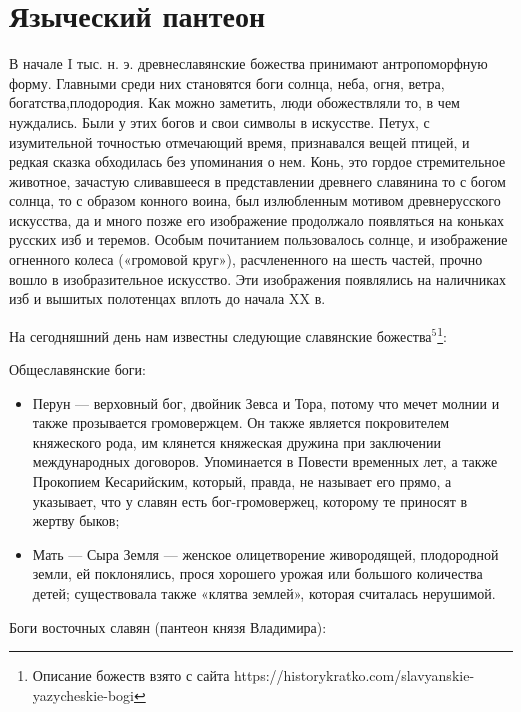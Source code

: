 \documentclass[a4paper, 12pt]{report}
\begin{document}
\section{Языческий пантеон}
В начале I тыс. н. э. древнеславянские божества принимают
антропоморфную форму. Главными среди них становятся боги солнца, неба, огня, ветра,
богатства,плодородия. Как можно заметить, люди обожествляли то, в чем нуждались. 
Были у этих богов и свои символы в искусстве. Петух, с изумительной
точностью отмечающий время, признавался вещей птицей, и редкая сказка
обходилась без упоминания о нем. Конь, это гордое стремительное
животное, зачастую сливавшееся в представлении древнего славянина то с
богом солнца, то с образом конного воина, был излюбленным мотивом
древнерусского искусства, да и много позже его изображение продолжало
появляться на коньках русских изб и теремов. Особым почитанием
пользовалось солнце, и изображение огненного колеса («громовой круг»),
расчлененного на шесть частей, прочно вошло в изобразительное искусство.
Эти изображения появлялись на наличниках изб и вышитых полотенцах
вплоть до начала XX в.


На сегодняшний день нам известны следующие славянские божества$^5$\footnote{Описание божеств взято с сайта https://historykratko.com/slavyanskie-yazycheskie-bogi}:

Общеславянские боги:

\begin{itemize}
  \item Перун — верховный бог, двойник Зевса и Тора, потому что мечет молнии и также прозывается громовержцем. Он также является покровителем княжеского рода, им клянется княжеская дружина при заключении международных договоров. Упоминается в Повести временных лет, а также Прокопием Кесарийским, который, правда, не называет его прямо, а указывает, что у славян есть бог-громовержец, которому те приносят в жертву быков;
  \item Мать — Сыра Земля — женское олицетворение живородящей, плодородной земли, ей поклонялись, прося хорошего урожая или большого количества детей; существовала также «клятва землей», которая считалась нерушимой.
\end{itemize}

Боги восточных славян (пантеон князя Владимира):
\end{document}
